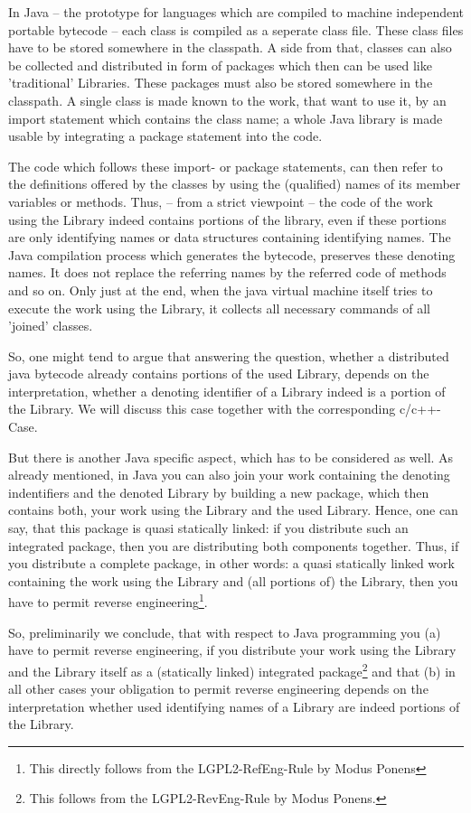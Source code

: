 In Java -- the prototype for languages which are compiled to machine independent
portable bytecode -- each class is compiled as a seperate class file. These
class files have to be stored somewhere in the classpath. A side from that,
classes can also be collected and distributed in form of packages which then can
be used like 'traditional' Libraries. These packages must also be stored
somewhere in the classpath. A single class is made known to the work, that want
to use it, by an import statement which contains the class name; a whole Java
library is made usable by integrating a package statement into the code.

The code which follows these import- or package statements, can then refer to
the definitions offered by the classes by using the (qualified) names of its
member variables or methods. Thus, -- from a strict viewpoint -- the code of the
work using the Library indeed contains portions of the library, even if these
portions are only identifying names or data structures containing identifying
names. The Java compilation process which generates the bytecode, preserves
these denoting names. It does not replace the referring names by the referred
code of methods and so on. Only just at the end, when the java virtual machine
itself tries to execute the work using the Library, it collects all necessary
commands of all 'joined' classes.

So, one might tend to argue that answering the question, whether a distributed
java bytecode already contains portions of the used Library, depends on the
interpretation, whether a denoting identifier of a Library indeed is a portion
of the Library. We will discuss this case together with the corresponding
c/c++-Case. 

But there is another Java specific aspect, which has to be considered as well.
As already mentioned, in Java you can also join your work containing the
denoting indentifiers and the denoted Library by building a new package, which
then contains both, your work using the Library and the used Library. Hence, one
can say, that this package is quasi statically linked: if you distribute such an
integrated package, then you are distributing both components together. Thus, if
you distribute a complete package, in other words: a quasi statically linked
work containing the work using the Library and (all portions of) the Library,
then you have to permit reverse engineering\footnote{This directly follows from
the LGPL2-RefEng-Rule by Modus Ponens}.

So, preliminarily we conclude, that with respect to Java programming you (a)
have to permit reverse engineering, if you distribute your work using the
Library and the Library itself as a (statically linked) integrated
package\footnote{This follows from the LGPL2-RevEng-Rule by Modus Ponens.} and
that (b) in all other cases your obligation to permit reverse engineering
depends on the interpretation whether used identifying names of a Library are
indeed portions of the Library.

